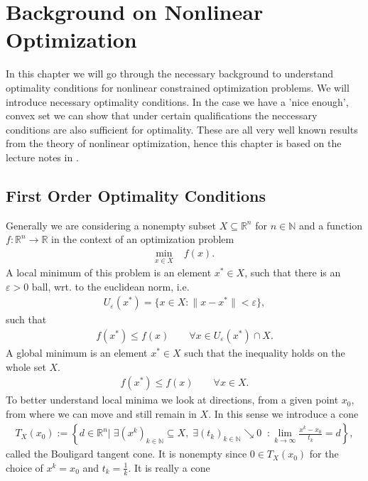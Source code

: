 \chapter{Background on Nonlinear Optimization}
In this chapter we will go through the necessary background to understand
optimality conditions for nonlinear constrained optimization problems. We
will introduce necessary optimality conditions. In the case we have a 'nice
enough', convex set we can show that under certain qualifications the
neccessary conditions are also sufficient for optimality. These are all very
well known results from the theory of nonlinear optimization, hence this
chapter is based on the lecture notes in
\cite{bot_optimization}.
\section{First Order Optimality Conditions}
Generally we are considering a nonempty subset $X \subseteq \mathbb{R}^{n}$
for $n \in \mathbb{N}$ and a function $f: \mathbb{R}^{n}  \to \mathbb{R}$ in
the context of an optimization problem
\begin{align}
    \min_{x \in X}\; &f(x) \label{eq: basic_opt}.
\end{align}
A local minimum of this problem is an element $x^{*} \in X$,
such that there is an $\varepsilon > 0$ ball, wrt. to the euclidean norm,
i.e.
\begin{align}
    U_\varepsilon(x^{*}) = \{x \in X: \|x - x^{*}\| < \varepsilon\},
\end{align}
such that
\begin{align}
    f(x^{*} ) \le f(x) \qquad \forall x \in U_\varepsilon(x^{*})\cap X.
\end{align}
A global minimum is an element $x^{*} \in X$ such that the inequality holds
on the whole set $X$.
\begin{align}
    f(x^{*}) \le f(x) \qquad \forall x \in X.
\end{align}
To better understand local minima we look at directions, from a given point
$x_0$, from where we can move and still remain in $X$. In this sense we
introduce a cone
\begin{align}
    T_X(x_0) := \left\{ d \in \mathbb{R}^{n}\Big|\;\exists (x^k)_{k \in
    \mathbb{N}} \subseteq X,\; \exists (t_k)_{k \in \mathbb{N} }\searrow
0\;\; : \lim_{k \to \infty} \frac{x^k-x_0}{t_k} = d  \right\},
\end{align}
called the Bouligard tangent cone. It is nonempty since $0 \in T_X(x_0)$ for
the choice of $x^{k} = x_0$ and $t_k = \frac{1}{k}$. It is really a cone
